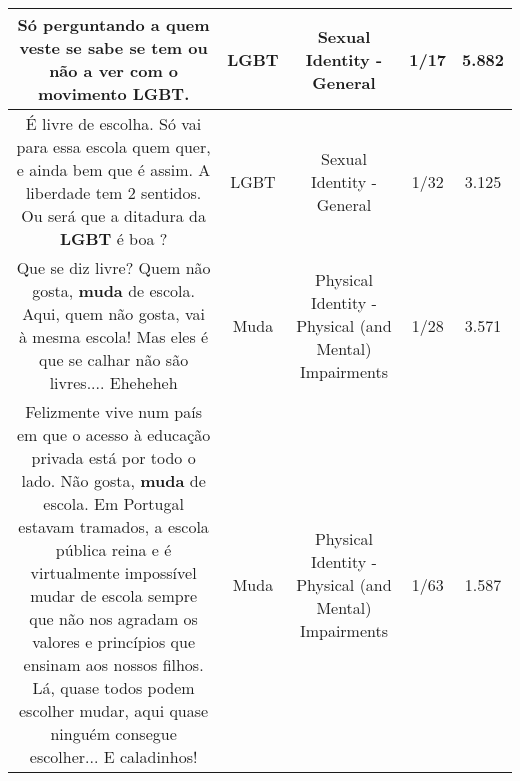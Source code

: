 \documentclass[11pt]{article}
\newlength\mylength
\begin{document}
\begin{center}
\begin{longtable}{|C{.65\mylength}|C{.30\mylength}|C{.12\mylength}|C{.12\mylength}|C{.12\mylength}|}
  \small Só perguntando a quem veste se sabe se tem ou não a ver com o movimento \textbf{LGBT}.\normalsize   & LGBT & Sexual Identity - General & 1/17 & 5.882 \\  \hline
  \small É livre de escolha. Só vai para essa escola quem quer, e ainda bem que é assim. A liberdade tem 2 sentidos. Ou será que a ditadura da \textbf{LGBT} é boa ?\normalsize   & LGBT & Sexual Identity - General & 1/32 & 3.125 \\  \hline
  \small Que se diz livre? Quem não gosta, \textbf{muda} de escola. Aqui, quem não gosta, vai à mesma escola! Mas eles é que se calhar não são livres.... Eheheheh\normalsize   & Muda & Physical Identity - Physical (and Mental) Impairments & 1/28 & 3.571 \\  \hline
  \small Felizmente vive num país em que o acesso à educação privada está por todo o lado. Não gosta, \textbf{muda} de escola. Em Portugal estavam tramados, a escola pública reina e é virtualmente impossível mudar de escola sempre que não nos agradam os valores e princípios que ensinam aos nossos filhos. Lá, quase todos podem escolher mudar, aqui quase ninguém consegue escolher... E caladinhos!\normalsize   & Muda & Physical Identity - Physical (and Mental) Impairments & 1/63 & 1.587 \\  \hline
  
\end{longtable}
\end{center}
\end{document}

